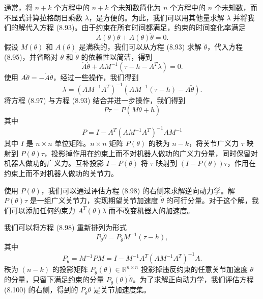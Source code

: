 \documentclass[12pt,a4paper]{article}
\begin{document}
通常，将 $n+k$ 个方程中的 $n+k$ 个未知数简化为 $n$ 个方程中的 $n$ 个未知数，而不显式计算拉格朗日乘数 $\lambda$，是方便的。为此，我们可以用其他量求解 $\lambda$ 并将我们的解代入方程 (8.93)。由于约束在所有时间都满足，约束的时间变化率满足
\begin{equation}
\dot{A}(\theta)\dot{\theta} + A(\theta)\ddot{\theta} = 0. \label{eq:8.95}
\end{equation}
假设 $M(\theta)$ 和 $A(\theta)$ 是满秩的，我们可以从方程 (8.93) 求解 $\ddot{\theta}$，代入方程 (8.95)，并省略对 $\theta$ 和 $\dot{\theta}$ 的依赖性以简洁，得到
\begin{equation}
\dot{A}\dot{\theta} + AM^{-1}(\tau - h - A^T\lambda) = 0. \label{eq:8.96}
\end{equation}
使用 $A\ddot{\theta} = -\dot{A}\dot{\theta}$，经过一些操作，我们得到
\begin{equation}
\lambda = (AM^{-1}A^T)^{-1}(AM^{-1}(\tau - h) - A\ddot{\theta}). \label{eq:8.97}
\end{equation}
将方程 (8.97) 与方程 (8.93) 结合并进一步操作，我们得到
\begin{equation}
P\tau = P(M\ddot{\theta} + h) \label{eq:8.98}
\end{equation}
其中
\begin{equation}
P = I - A^T(AM^{-1}A^T)^{-1}AM^{-1} \label{eq:8.99}
\end{equation}
其中 $I$ 是 $n \times n$ 单位矩阵。$n \times n$ 矩阵 $P(\theta)$ 的秩为 $n-k$，将关节广义力 $\tau$ 映射到 $P(\theta)\tau$，投影掉作用在约束上而不对机器人做功的广义力分量，同时保留对机器人做功的广义力。互补投影 $I - P(\theta)$ 将 $\tau$ 映射到 $(I - P(\theta))\tau$，作用在约束上而不对机器人做功的关节力。

使用 $P(\theta)$，我们可以通过评估方程 (8.98) 的右侧来求解逆向动力学。解 $P(\theta)\tau$ 是一组广义关节力，实现期望关节加速度 $\ddot{\theta}$ 的可行分量。对于这个解，我们可以添加任何约束力 $A^T(\theta)\lambda$ 而不改变机器人的加速度。

我们可以将方程 (8.98) 重新排列为形式
\begin{equation}
P_{\ddot{\theta}}\ddot{\theta} = P_{\ddot{\theta}}M^{-1}(\tau - h), \label{eq:8.100}
\end{equation}
其中
\begin{equation}
P_{\ddot{\theta}} = M^{-1}PM = I - M^{-1}A^T(AM^{-1}A^T)^{-1}A. \label{eq:8.101}
\end{equation}
秩为 $(n-k)$ 的投影矩阵 $P_{\ddot{\theta}}(\theta) \in \mathbb{R}^{n \times n}$ 投影掉违反约束的任意关节加速度 $\ddot{\theta}$ 的分量，只留下满足约束的分量 $P_{\ddot{\theta}}(\theta)\ddot{\theta}$。为了求解正向动力学，我们评估方程 (8.100) 的右侧，得到的 $P_{\ddot{\theta}}\ddot{\theta}$ 是关节加速度集。
\end{document}
